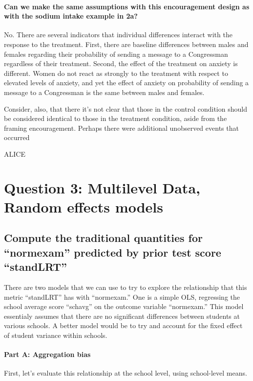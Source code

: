 \documentclass{article}
\begin{document}
\paragraph{Can we make the same assumptions with this encouragement design as with the sodium intake example in 2a?}
No.  There are several indicators that individual differences interact with the response to the treatment.  First, there are baseline differences between males and females regarding their probability of sending a message to a Congressman regardless of their treatment.  Second, the effect of the treatment on anxiety is different.  Women do not react as strongly to the treatment with respect to elevated levels of anxiety, and yet the effect of anxiety on probability of sending a message to a Congressman is the same between males and females.

Consider, also, that there it's not clear that those in the control condition should be considered identical to those in the treatment condition, aside from the framing encouragement.  Perhaps there were additional unobserved events that occurred 

ALICE

\section{Question 3: Multilevel Data, Random effects models}


\subsection{Compute the traditional quantities for ``normexam'' predicted by prior test score ``standLRT''}

There are two models that we can use to try to explore the relationship that this metric ``standLRT'' has with ``normexam.''  One is a simple OLS, regressing the school average score ``schavg'' on the outcome variable ``normexam.''  This model essentialy assumes that there are no significant differences between students at various schools.  A better model would be to try and account for the fixed effect of student variance within schools.

\paragraph{Part A: Aggregation bias} 
First, let's evaluate this relationship at the school level, using school-level means. 
\end{document}
